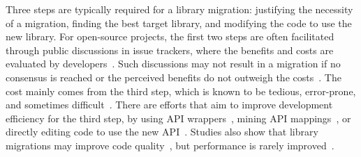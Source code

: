 \documentclass[sigconf, screen]{acmart}
\begin{document}
Three steps are typically required for a library migration: justifying the necessity of a migration, finding the best target library, and modifying the code to use the new library.
For open-source projects, the first two steps are often facilitated through public discussions in issue trackers, where the benefits and costs are evaluated by developers~\cite{kabinna2016logging}.
Such discussions may not result in a migration if no consensus is reached or the perceived benefits do not outweigh the costs~\cite{kabinna2016logging}.
The cost mainly comes from the third step, which is known to be tedious, error-prone, and sometimes difficult~\cite{alrubaye2019use, chen2019mining}. %
There are efforts that aim to improve development efficiency for the third step, by using API wrappers~\cite{bartolomei2009study, bartolomei2010swing}, mining API mappings~\cite{teyton2013automatic, alrubaye2019use, chen2019mining, alrubaye2020learning}, or directly editing code to use the new API~\cite{xu2019meditor, collie2020m3}. 
Studies also show that library migrations may improve code quality~\cite{alrubaye2020does}, but performance is rarely improved~\cite{kabinna2016logging}.
\end{document}
